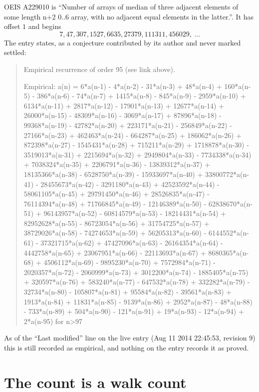 \documentclass[11pt,a4paper]{article}
\theoremstyle{plain}
\theoremstyle{definition}
\begin{document}
OEIS A229010 is ``Number of arrays of median of three adjacent elements of some length n+2 0..6 array, with no adjacent equal elements in the latter.''. It has offset $1$ and begins
\[
7, 47, 307, 1527, 6635, 27379, 111311, 456029,\ \dots
\]
The entry states, as a conjecture contributed by its author and never marked settled:
\begin{quote}\raggedright\small
Empirical recurrence of order 95 (see link above).

Empirical: a(n) = 6*a(n-1) - 4*a(n-2) - 31*a(n-3) + 48*a(n-4) + 160*a(n-5) - 386*a(n-6) - 74*a(n-7) + 1415*a(n-8) - 845*a(n-9) - 2959*a(n-10) + 6134*a(n-11) + 2817*a(n-12) - 17901*a(n-13) + 12677*a(n-14) + 26000*a(n-15) - 48309*a(n-16) - 3069*a(n-17) + 87896*a(n-18) - 99368*a(n-19) - 42782*a(n-20) + 223171*a(n-21) - 256849*a(n-22) - 27166*a(n-23) + 462463*a(n-24) - 664287*a(n-25) + 186062*a(n-26) + 872398*a(n-27) - 1545431*a(n-28) + 715211*a(n-29) + 1718878*a(n-30) - 3519013*a(n-31) + 2215694*a(n-32) + 2949804*a(n-33) - 7734338*a(n-34) + 7038324*a(n-35) + 2206791*a(n-36) - 13839312*a(n-37) + 18135366*a(n-38) - 6528750*a(n-39) - 15933697*a(n-40) + 33800772*a(n-41) - 28455673*a(n-42) - 3291180*a(n-43) + 42523592*a(n-44) - 58061105*a(n-45) + 29791450*a(n-46) + 28526835*a(n-47) - 76114394*a(n-48) + 71766845*a(n-49) - 12146389*a(n-50) - 62838670*a(n-51) + 96143957*a(n-52) - 60814579*a(n-53) - 18214431*a(n-54) + 82952628*a(n-55) - 86723054*a(n-56) + 31754725*a(n-57) + 38729026*a(n-58) - 74274653*a(n-59) + 56205313*a(n-60) - 6144552*a(n-61) - 37321715*a(n-62) + 47427096*a(n-63) - 26164354*a(n-64) - 4442758*a(n-65) + 23067951*a(n-66) - 22113693*a(n-67) + 8680365*a(n-68) + 4506112*a(n-69) - 9895230*a(n-70) + 7572984*a(n-71) - 2020357*a(n-72) - 2060999*a(n-73) + 3012200*a(n-74) - 1885405*a(n-75) + 320597*a(n-76) + 583240*a(n-77) - 647532*a(n-78) + 332282*a(n-79) - 32734*a(n-80) - 105807*a(n-81) + 95584*a(n-82) - 39561*a(n-83) + 1913*a(n-84) + 11831*a(n-85) - 9139*a(n-86) + 2952*a(n-87) - 48*a(n-88) - 733*a(n-89) + 504*a(n-90) - 121*a(n-91) + 19*a(n-93) - 12*a(n-94) + 2*a(n-95) for n>97
\end{quote}
As of the ``Last modified'' line on the live entry (Aug 11 2014 22:45:53, revision 9) this is still
recorded as empirical, and nothing on the entry records it as proved.

\section{The count is a walk count}
\end{document}
